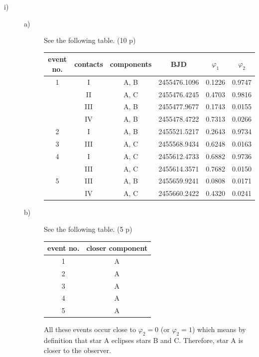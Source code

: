 \begin{description}
\item[i)] \hfill
  \begin{description}
  \item[a)] See the following table. \hfill(10 p)

    \begin{center}
    \begin{tabular}{cccccc}
      \hline
      event no. & contacts & components & BJD & $\varphi_1$ & $\varphi_2$ \\
      \hline
      1 & I   & A, B & 2455476.1096 & 0.1226 & 0.9747 \\
        & II  & A, C & 2455476.4245 & 0.4703 & 0.9816 \\
        & III & A, B & 2455477.9677 & 0.1743 & 0.0155 \\
        & IV  & A, B & 2455478.4722 & 0.7313 & 0.0266 \\
      2 & I   & A, B & 2455521.5217 & 0.2643 & 0.9734 \\
      3 & III & A, C & 2455568.9434 & 0.6248 & 0.0163 \\
      4 & I   & A, C & 2455612.4733 & 0.6882 & 0.9736 \\
        & III & A, C & 2455614.3571 & 0.7682 & 0.0150 \\
      5 & III & A, B & 2455659.9241 & 0.0808 & 0.0171 \\
        & IV  & A, C & 2455660.2422 & 0.4320 & 0.0241 \\
      \hline
    \end{tabular}
    \end{center}

  \item[b)] See the following table. \hfill(5 p)

    \begin{center}
    \begin{tabular}{cc}
      \hline
      event no. & closer component \\
      \hline
      1 & A \\
      2 & A \\
      3 & A \\
      4 & A \\
      5 & A \\
      \hline
    \end{tabular}
    \end{center}

    All these events occur close to $\varphi_2 = 0$ (or $\varphi_2 = 1$)
    which means by definition that star A eclipses stars B and C. Therefore,
    star A is closer to the observer.


\end{description}
\end{description}
